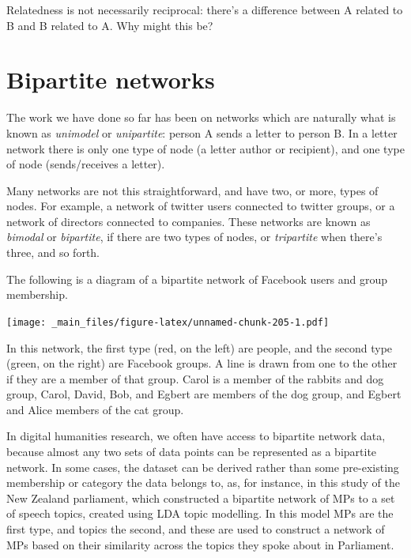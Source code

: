 \documentclass[
]{book}
\begin{document}
Relatedness is not necessarily reciprocal: there's a difference between A related to B and B related to A. Why might this be?

\hypertarget{bipartite-networks-1}{%
\section{Bipartite networks}\label{bipartite-networks-1}}

The work we have done so far has been on networks which are naturally what is known as \emph{unimodel} or \emph{unipartite}: person A sends a letter to person B. In a letter network there is only one type of node (a letter author or recipient), and one type of node (sends/receives a letter).

Many networks are not this straightforward, and have two, or more, types of nodes. For example, a network of twitter users connected to twitter groups, or a network of directors connected to companies. These networks are known as \emph{bimodal} or \emph{bipartite}, if there are two types of nodes, or \emph{tripartite} when there's three, and so forth.

The following is a diagram of a bipartite network of Facebook users and group membership.

\texttt{[image: \_main\_files/figure-latex/unnamed-chunk-205-1.pdf]}

In this network, the first type (red, on the left) are people, and the second type (green, on the right) are Facebook groups. A line is drawn from one to the other if they are a member of that group. Carol is a member of the rabbits and dog group, Carol, David, Bob, and Egbert are members of the dog group, and Egbert and Alice members of the cat group.

In digital humanities research, we often have access to bipartite network data, because almost any two sets of data points can be represented as a bipartite network. In some cases, the dataset can be derived rather than some pre-existing membership or category the data belongs to, as, for instance, in this study of the New Zealand parliament, which constructed a bipartite network of MPs to a set of speech topics, created using LDA topic modelling. In this model MPs are the first type, and topics the second, and these are used to construct a network of MPs based on their similarity across the topics they spoke about in Parliament.
\end{document}
